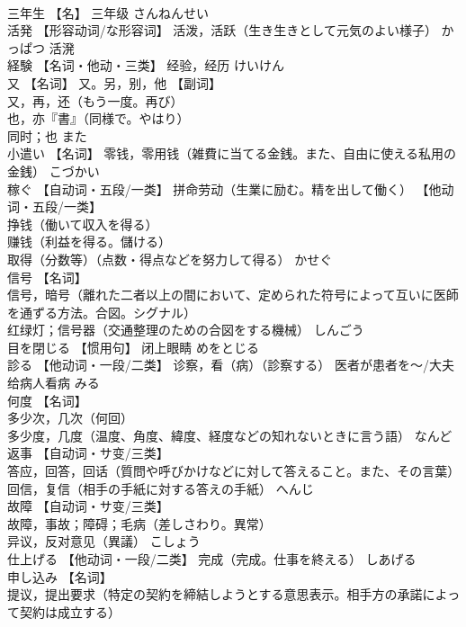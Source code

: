 \documentclass[8pt]{extreport}
\begin{document}
\begin{CJK}{UTF8}{min}
\\	三年生	【名】 三年级	さんねんせい	
\\	活発	【形容动词/な形容词】 活泼，活跃（生き生きとして元気のよい様子）	かっぱつ	活溌
\\	経験	【名词・他动・三类】 经验，经历	けいけん	
\\	又	【名词】 又。另，别，他 【副词】 
\\	又，再，还（もう一度。再び） 
\\	也，亦『書』（同様で。やはり） 
\\	同时；也	また	
\\	小遣い	【名词】 零钱，零用钱（雑費に当てる金銭。また、自由に使える私用の金銭）	こづかい	
\\	稼ぐ	【自动词・五段/一类】 拼命劳动（生業に励む。精を出して働く） 【他动词・五段/一类】 
\\	挣钱（働いて収入を得る） 
\\	赚钱（利益を得る。儲ける） 
\\	取得（分数等）（点数・得点などを努力して得る）	かせぐ	
\\	信号	【名词】 
\\	信号，暗号（離れた二者以上の間において、定められた符号によって互いに医師を通ずる方法。合図。シグナル） 
\\	红绿灯；信号器（交通整理のための合図をする機械）	しんごう	
\\	目を閉じる	【惯用句】 闭上眼睛	めをとじる	
\\	診る	【他动词・一段/二类】 诊察，看（病）（診察する） 医者が患者を～/大夫给病人看病	みる	
\\	何度	【名词】 
\\	多少次，几次（何回） 
\\	多少度，几度（温度、角度、緯度、経度などの知れないときに言う語）	なんど	
\\	返事	【自动词・サ变/三类】 
\\	答应，回答，回话（質問や呼びかけなどに対して答えること。また、その言葉） 
\\	回信，复信（相手の手紙に対する答えの手紙）	へんじ	
\\	故障	【自动词・サ变/三类】 
\\	故障，事故；障碍；毛病（差しさわり。異常） 
\\	异议，反对意见（異議）	こしょう	
\\	仕上げる	【他动词・一段/二类】 完成（完成。仕事を終える）	しあげる	
\\	申し込み	【名词】 
\\	提议，提出要求（特定の契約を締結しようとする意思表示。相手方の承諾によって契約は成立する） 

\end{CJK}
\end{document}
